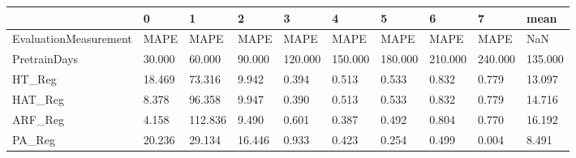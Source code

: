 \begin{tabular}{llllllllll}
\toprule
{} &      0 &       1 &      2 &       3 &       4 &       5 &       6 &       7 &    mean \\
\midrule
EvaluationMeasurement &   MAPE &    MAPE &   MAPE &    MAPE &    MAPE &    MAPE &    MAPE &    MAPE &     NaN \\
PretrainDays          & 30.000 &  60.000 & 90.000 & 120.000 & 150.000 & 180.000 & 210.000 & 240.000 & 135.000 \\
HT\_Reg                & 18.469 &  73.316 &  9.942 &   0.394 &   0.513 &   0.533 &   0.832 &   0.779 &  13.097 \\
HAT\_Reg               &  8.378 &  96.358 &  9.947 &   0.390 &   0.513 &   0.533 &   0.832 &   0.779 &  14.716 \\
ARF\_Reg               &  4.158 & 112.836 &  9.490 &   0.601 &   0.387 &   0.492 &   0.804 &   0.770 &  16.192 \\
PA\_Reg                & 20.236 &  29.134 & 16.446 &   0.933 &   0.423 &   0.254 &   0.499 &   0.004 &   8.491 \\
\bottomrule
\end{tabular}
